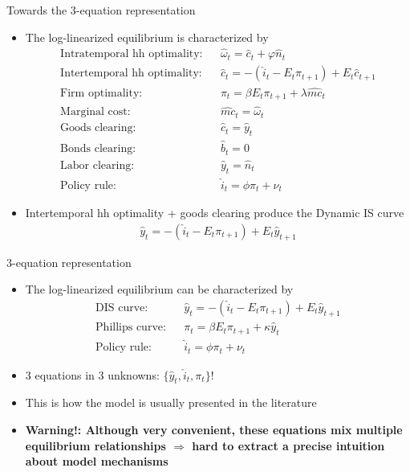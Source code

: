 \documentclass[9pt,xcolor={dvipsnames}]{beamer}
\newcommand{\bit}{\begin{itemize}}
\newcommand{\eit}{\end{itemize}}
\newcommand{\bc}{\color{blue}}
\begin{document}
\begin{frame}{Towards the 3-equation representation}

\bit
\setlength\itemsep{1.5em}
\item The log-linearized equilibrium is characterized by
\begin{eqnarray}
\text{Intratemporal hh optimality:} && \hat \omega_t = \hat c_t + \varphi \hat n_t  \nonumber \\
\text{Intertemporal hh optimality:} && \hat c_t =  - (\hat i_t - E_t \pi_{t+1}) + E_t \hat c_{t+1}  \nonumber \\
\text{Firm optimality:} && \pi_t = \beta E_t \pi_{t+1} + \lambda \widehat{mc}_t \nonumber \\
\text{Marginal cost:} && \widehat{mc}_t = \hat \omega_t \nonumber \\
\text{Goods clearing:} && \hat c_t = \hat y_t \nonumber \\
\text{Bonds clearing:} && \hat b_t = 0 \nonumber \\
\text{Labor clearing:} && \hat y_t = \hat n_t \nonumber \\
\text{Policy rule:} && \hat i_t = \phi \pi_t + \nu_t \nonumber 
\end{eqnarray}

\item Intertemporal hh optimality + goods clearing produce the {\bc Dynamic IS curve}
\begin{eqnarray}
\hat y_t =  - (\hat i_t - E_t \pi_{t+1}) + E_t \hat y_{t+1}\nonumber
\end{eqnarray} 
\eit

\end{frame}

\begin{frame}{3-equation representation}

\bit
\setlength\itemsep{1.5em}
\item The log-linearized equilibrium can be characterized by
\begin{eqnarray}
\text{DIS curve:} && \hat y_t = - (\hat i_t-E_t \pi_{t+1}) + E_t \hat y_{t+1} \nonumber \\
\text{Phillips curve:} && \pi_t = \beta E_t \pi_{t+1} + \kappa \hat y_t \nonumber \\
\text{Policy rule:} && \hat i_t = \phi \pi_t + \nu_t \nonumber 
\end{eqnarray}

\item 3 equations in 3 unknowns: $\{\hat y_t, \hat i_{t}, \pi_t\}$!	

\item This is how the model is usually presented in the literature

\item \bf Warning!: \normalfont Although very convenient, these equations mix multiple equilibrium relationships $\Rightarrow$ hard to extract a precise intuition about model mechanisms
\eit

\end{frame}
\end{document}
